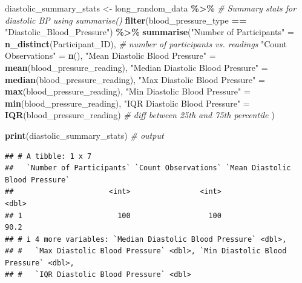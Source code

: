 \documentclass[
]{article}
\newenvironment{Shaded}{\begin{snugshade}}{\end{snugshade}}
\newcommand{\CommentTok}[1]{\textcolor[rgb]{0.56,0.35,0.01}{\textit{#1}}}
\newcommand{\FunctionTok}[1]{\textcolor[rgb]{0.13,0.29,0.53}{\textbf{#1}}}
\newcommand{\NormalTok}[1]{#1}
\newcommand{\OtherTok}[1]{\textcolor[rgb]{0.56,0.35,0.01}{#1}}
\newcommand{\SpecialCharTok}[1]{\textcolor[rgb]{0.81,0.36,0.00}{\textbf{#1}}}
\newcommand{\StringTok}[1]{\textcolor[rgb]{0.31,0.60,0.02}{#1}}
\begin{document}
\begin{Shaded}
\begin{Highlighting}[]
\NormalTok{diastolic\_summary\_stats }\OtherTok{\textless{}{-}}\NormalTok{ long\_random\_data }\SpecialCharTok{\%\textgreater{}\%} \CommentTok{\# Summary stats for diastolic BP using summarise()}
  \FunctionTok{filter}\NormalTok{(blood\_pressure\_type }\SpecialCharTok{==} \StringTok{"Diastolic\_Blood\_Pressure"}\NormalTok{) }\SpecialCharTok{\%\textgreater{}\%}
  \FunctionTok{summarise}\NormalTok{(}\StringTok{"Number of Participants"} \OtherTok{=} \FunctionTok{n\_distinct}\NormalTok{(Participant\_ID), }\CommentTok{\# number of participants vs. readings}
            \StringTok{"Count Observations"} \OtherTok{=} \FunctionTok{n}\NormalTok{(),}
            \StringTok{"Mean Diastolic Blood Pressure"} \OtherTok{=} \FunctionTok{mean}\NormalTok{(blood\_pressure\_reading),}
            \StringTok{"Median Diastolic Blood Pressure"} \OtherTok{=} \FunctionTok{median}\NormalTok{(blood\_pressure\_reading),}
            \StringTok{"Max Diastolic Blood Pressure"} \OtherTok{=} \FunctionTok{max}\NormalTok{(blood\_pressure\_reading),}
            \StringTok{"Min Diastolic Blood Pressure"} \OtherTok{=} \FunctionTok{min}\NormalTok{(blood\_pressure\_reading),}
            \StringTok{"IQR Diastolic Blood Pressure"} \OtherTok{=} \FunctionTok{IQR}\NormalTok{(blood\_pressure\_reading) }\CommentTok{\# diff between 25th and 75th percentile}
\NormalTok{  )}

\FunctionTok{print}\NormalTok{(diastolic\_summary\_stats) }\CommentTok{\# output}
\end{Highlighting}
\end{Shaded}

\begin{verbatim}
## # A tibble: 1 x 7
##   `Number of Participants` `Count Observations` `Mean Diastolic Blood Pressure`
##                      <int>                <int>                           <dbl>
## 1                      100                  100                            90.2
## # i 4 more variables: `Median Diastolic Blood Pressure` <dbl>,
## #   `Max Diastolic Blood Pressure` <dbl>, `Min Diastolic Blood Pressure` <dbl>,
## #   `IQR Diastolic Blood Pressure` <dbl>
\end{verbatim}
\end{document}
